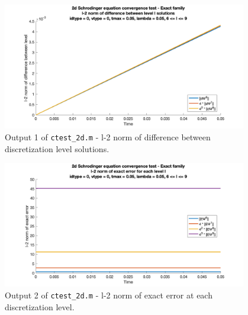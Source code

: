 \documentclass[10pt]{article}
\def\code#1{\texttt{#1}} %
\begin{document}
\begin{figure}[H]
\centering
\includegraphics[width=0.95\textwidth]{problem2/ctest_2d-1.png}
\caption{Output 1 of \code{ctest\_2d.m} - 
l-2 norm of difference between discretization level solutions.}
\end{figure}
\begin{figure}[H]
\centering
\includegraphics[width=0.95\textwidth]{problem2/ctest_2d-2.png}
\caption{Output 2 of \code{ctest\_2d.m} - 
l-2 norm of exact error at each discretization level.}
\end{figure}
\end{document}

